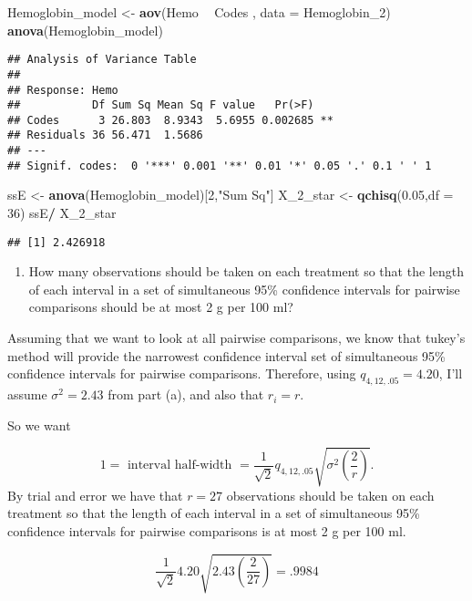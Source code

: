 \documentclass[12pt,]{article}
\newenvironment{Shaded}{\begin{snugshade}}{\end{snugshade}}
\newcommand{\KeywordTok}[1]{\textcolor[rgb]{0.13,0.29,0.53}{\textbf{#1}}}
\newcommand{\DataTypeTok}[1]{\textcolor[rgb]{0.13,0.29,0.53}{#1}}
\newcommand{\DecValTok}[1]{\textcolor[rgb]{0.00,0.00,0.81}{#1}}
\newcommand{\FloatTok}[1]{\textcolor[rgb]{0.00,0.00,0.81}{#1}}
\newcommand{\StringTok}[1]{\textcolor[rgb]{0.31,0.60,0.02}{#1}}
\newcommand{\OperatorTok}[1]{\textcolor[rgb]{0.81,0.36,0.00}{\textbf{#1}}}
\newcommand{\NormalTok}[1]{#1}
\providecommand{\tightlist}{%
  \setlength{\itemsep}{0pt}\setlength{\parskip}{0pt}}
\begin{document}
\begin{Shaded}
\begin{Highlighting}[]
\NormalTok{Hemoglobin_model <-}\StringTok{ }\KeywordTok{aov}\NormalTok{(Hemo }\OperatorTok{~}\StringTok{ }\NormalTok{Codes , }\DataTypeTok{data =}\NormalTok{ Hemoglobin_}\DecValTok{2}\NormalTok{)}
\KeywordTok{anova}\NormalTok{(Hemoglobin_model)}
\end{Highlighting}
\end{Shaded}

\begin{verbatim}
## Analysis of Variance Table
## 
## Response: Hemo
##           Df Sum Sq Mean Sq F value   Pr(>F)   
## Codes      3 26.803  8.9343  5.6955 0.002685 **
## Residuals 36 56.471  1.5686                    
## ---
## Signif. codes:  0 '***' 0.001 '**' 0.01 '*' 0.05 '.' 0.1 ' ' 1
\end{verbatim}

\begin{Shaded}
\begin{Highlighting}[]
\NormalTok{ssE <-}\StringTok{ }\KeywordTok{anova}\NormalTok{(Hemoglobin_model)[}\DecValTok{2}\NormalTok{,}\StringTok{"Sum Sq"}\NormalTok{]}
\NormalTok{X_2_star <-}\StringTok{ }\KeywordTok{qchisq}\NormalTok{(}\FloatTok{0.05}\NormalTok{,}\DataTypeTok{df =} \DecValTok{36}\NormalTok{)}
\NormalTok{ssE}\OperatorTok{/}\StringTok{ }\NormalTok{X_2_star}
\end{Highlighting}
\end{Shaded}

\begin{verbatim}
## [1] 2.426918
\end{verbatim}

\begin{enumerate}
\def\labelenumi{(\alph{enumi})}
\setcounter{enumi}{1}
\tightlist
\item
  How many observations should be taken on each treatment so that the
  length of each interval in a set of simultaneous 95\% confidence
  intervals for pairwise comparisons should be at most 2 g per 100 ml?
\end{enumerate}

Assuming that we want to look at all pairwise comparisons, we know that
tukey's method will provide the narrowest confidence interval set of
simultaneous 95\% confidence intervals for pairwise comparisons.
Therefore, using \(q_{4,12,.05} = 4.20\), I'll assume
\(\sigma^2 = 2.43\) from part (a), and also that \(r_i = r\).

So we want

\[
1 = \text{ interval half-width }= \frac{1}{\sqrt{2}} q_{4,12,.05} \sqrt{\sigma^2 \left( \frac{2}{r}\right)}.
\] By trial and error we have that \(r= 27\) observations should be
taken on each treatment so that the length of each interval in a set of
simultaneous 95\% confidence intervals for pairwise comparisons is at
most 2 g per 100 ml.

\[ \frac{1}{\sqrt{2}} 4.20  \sqrt{2.43 \left( \frac{2}{27}\right)} = .9984\]
\end{document}
